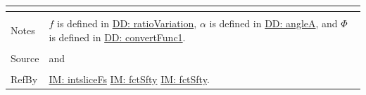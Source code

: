 \documentclass[12pt]{article}
\begin{document}
\begin{minipage}{\textwidth}
\begin{tabular}{p{} p{}}
\begin{symbDescription}
                                                  \end{symbDescription}
                                                  \\ \midrule \\
                                                  Notes & $f$ is defined in \hyperref[DD:ratioVariation]{DD: ratioVariation}, $α$ is defined in \hyperref[DD:angleA]{DD: angleA}, and $Φ$ is defined in \hyperref[DD:convertFunc1]{DD: convertFunc1}.
                                                          \\ \midrule \\
                                                          Source & \cite{chen2005} and \cite{karchewski2012}
                                                                   \\ \midrule \\
                                                                   RefBy & \hyperref[IM:intsliceFs]{IM: intsliceFs} \hyperref[IM:fctSfty]{IM: fctSfty} \hyperref[IM:fctSfty]{IM: fctSfty}.
\\ \bottomrule \end{tabular}
\end{minipage}
\par~
\end{document}
